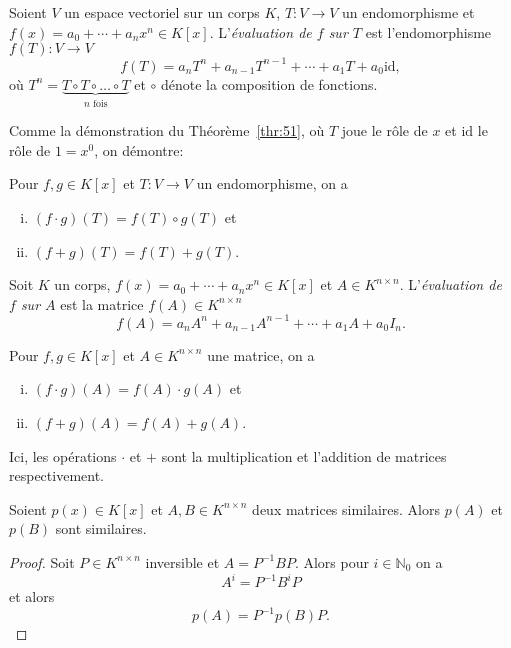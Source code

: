 \begin{definition}
  \label{def:34}
  Soient $V$ un espace vectoriel sur un corps $K$,
  $T: V \rightarrow V$ un endomorphisme et
  $f(x) = a_0+ \cdots + a_n x^n\in K[x]$. L'\emph{évaluation de $f$
    sur $T$} est l'endomorphisme $f(T): V \rightarrow V$
  \begin{displaymath}
    f(T) = a_n T^n + a_{n-1}T^{n-1}+ \cdots + a_1 T + a_0 \mathrm{id},
  \end{displaymath}
  où $T^n = \underbrace{T \circ T \circ \dots \circ T}_{n \text{ fois}}$ et $\circ$ dénote la composition de fonctions. 
\end{definition}




\begin{remark}
  \label{rem:8}
  Comme la démonstration du Théorème~\ref{thr:51}, où $T$ joue le rôle de $x$ et $ \mathrm{id}$ le rôle de $1 = x^0$, on démontre:

  \medskip
  \noindent 
  Pour $f,g ∈ K[x]$ et  $T: V \rightarrow V$ un endomorphisme, on a
  \begin{enumerate}[i)]
  \item $(f ⋅ g) (T) =  f(T) \circ g(T)$ et
  \item $(f + g) (T) =  f(T) + g(T)$.
  \end{enumerate} 
\end{remark}


\begin{definition}
  \label{def:34m}
 Soit  $K$ un corps, $f(x) = a_0+ \cdots + a_n x^n\in K[x]$  et $A  ∈ K^{n ×n}$. 
  L'\emph{évaluation de $f$
    sur $A$} est la matrice  $f(A) ∈ K^{n ×n}$ 
  \begin{displaymath}
    f(A) = a_n A^n + a_{n-1}A^{n-1}+ \cdots + a_1 A + a_0 I_n. 
  \end{displaymath}
\end{definition}


\begin{remark}
  \label{rem:8:m}
  Pour $f,g ∈ K[x]$ et  $A ∈ K^{n ×n}$  une matrice, on a
  \begin{enumerate}[i)]
  \item $(f ⋅ g) (A) =  f(A) ⋅ g(A)$ et
  \item $(f + g) (A) =  f(A) + g(A)$.
  \end{enumerate}
  Ici, les opérations  $⋅$ et $+$ sont  la multiplication et l'addition de matrices respectivement. 
\end{remark}

\begin{lemma}
  \label{lem:27}
  Soient $p(x) ∈ K[x]$ et $A,B ∈ K^{n ×n}$ deux matrices similaires. Alors $p(A)$ et $p(B)$ sont similaires. 
\end{lemma}
\begin{proof}
  Soit $P ∈ K^{n ×n}$ inversible et $A = P^{-1}BP$. Alors pour $i ∈ ℕ_0$ on a
  \begin{displaymath}
    A^i = P^{-1} B^i P 
  \end{displaymath}
  et alors
  \begin{displaymath}
    p(A) = P^{-1} p(B) P. 
  \end{displaymath}
\end{proof}




